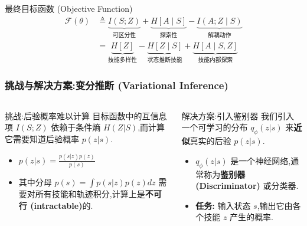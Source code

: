 \documentclass{beamer}
\begin{document}
\begin{frame}
    \begin{alertblock}{最终目标函数 (Objective Function)}
    \begin{align*}
        \mathcal{F}(\theta) 
        &\triangleq \underbrace{I(S; Z)}_{\text{可区分性}} 
                 + \underbrace{H[A \mid S]}_{\text{探索性}} 
                 - \underbrace{I(A; Z \mid S)}_{\text{解耦动作}} \\
        &= \underbrace{H[Z]}_{\text{技能多样性}} 
           - \underbrace{H[Z \mid S]}_{\text{状态推断技能}} 
           + \underbrace{H[A \mid S, Z]}_{\text{技能内部探索}}
    \end{align*}
    \end{alertblock}

\end{frame}

\begin{frame}
    
    \frametitle{挑战与解决方案:变分推断 (Variational Inference)}
    \tiny
    \vspace{-0.2cm}
    \begin{columns}[T]
        \begin{column}{0.5\textwidth}
            \begin{alertblock}{挑战:后验概率难以计算}
                目标函数中的互信息项 $I(S;Z)$ 依赖于条件熵 $H(Z|S)$,而计算它需要知道后验概率 $p(z|s)$.
                \vspace{0.3em}
                \begin{itemize}
                    \item $p(z|s) = \frac{p(s|z)p(z)}{p(s)}$
                    \item 其中分母 $p(s) = \int p(s|z)p(z)dz$ 需要对所有技能和轨迹积分,计算上是\textbf{不可行 (intractable)}的.
                \end{itemize}
            \end{alertblock}
        \end{column}

        \begin{column}{0.5\textwidth}
            \begin{block}{解决方案:引入鉴别器}
                我们引入一个可学习的分布 $q_\phi(z|s)$ 来\textbf{近似}真实的后验 $p(z|s)$.
                \vspace{0.3em}
                \begin{itemize}
                    \item $q_\phi(z|s)$ 是一个神经网络,通常称为\textbf{鉴别器 (Discriminator)} 或分类器.
                    \item \textbf{任务:} 输入状态 $s$,输出它由各个技能 $z$ 产生的概率.
                \end{itemize}
            \end{block}
        \end{column}
    \end{columns}


\end{frame}
\end{document}
